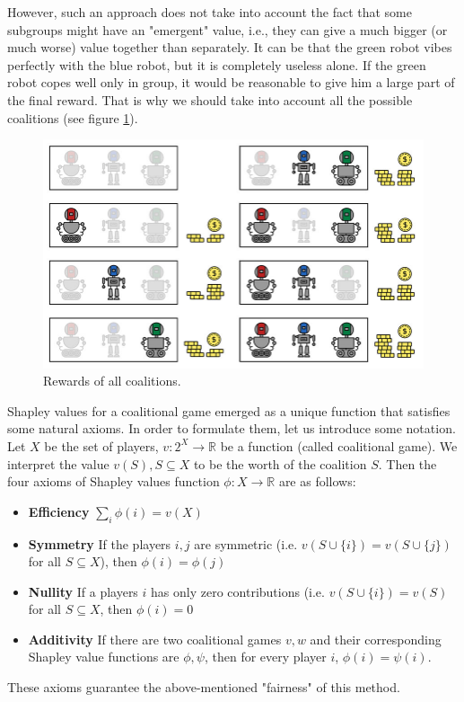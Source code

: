 \documentclass[magisterska,en]{pracamgr}
\begin{document}
However, such an approach does not take into account the fact that some subgroups might have an "emergent" value, i.e., they can give a much bigger (or much worse) value together than separately. It can be that the green robot vibes perfectly with the blue robot, but it is completely useless alone. If the green robot copes well only in group, it would be reasonable to give him a large part of the final reward. That is why we should take into account all the possible coalitions (see figure \ref{rewards_all}).

\begin{figure}[H]
\centering
\includegraphics[scale=0.3]{./images/Shap_all_coal.png}
\caption{Rewards of all coalitions.}
\label{rewards_all}
\end{figure}

Shapley values for a coalitional game emerged as a unique function that satisfies some natural axioms. In order to formulate them, let us introduce some notation.  Let $X$ be the set of players, $v: 2^X \rightarrow \mathbb{R}$ be a function (called coalitional game). We interpret the value $v(S), S \subseteq X$ to be the worth of the coalition $S$. Then the four axioms of Shapley values function $\phi:X  \rightarrow \mathbb{R}$ are as follows:
\begin{itemize}
\item \textbf{Efficiency}  $\sum_i  \phi(i) = v(X)$
\item \textbf{Symmetry} If the players $i, j$ are symmetric (i.e. $v(S\cup \{i\}) = v(S \cup \{j\})$ for all $S \subseteq X$), then $\phi(i) = \phi(j)$
\item \textbf{Nullity} If a players $i$ has only zero contributions (i.e. $v(S\cup \{i\}) = v(S)$ for all $S \subseteq X$, then $\phi(i) = 0$
\item \textbf{Additivity} If there are two coalitional games $v, w$ and their corresponding Shapley value functions are $\phi, \psi$, then for every player $i$, $\phi(i) = \psi(i)$.
\label{Shapley_axioms}
\end{itemize}
These axioms guarantee the above-mentioned "fairness" of this method. 
\end{document}
